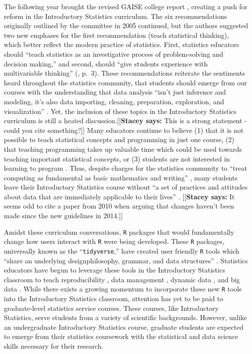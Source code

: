 \documentclass[12pt]{article}
\newcommand{\stacey}[1]{{\color{purple}[[\textbf{Stacey says: }#1]]}}
\begin{document}
\quad The following year brought the revised GAISE college report 
\citep{gaise}, creating a push for reform in the Introductory Statistics 
curriculum. The six recommendations originally outlined by the committee in 2005
continued, but the authors suggested two new emphases for the first
recommendation (teach statistical thinking), which better reflect the modern
practice of statistics. First, statistics educators should ``teach statistics as
an investigative process of problem-solving and decision making,'' and second, should 
``give students experience with multivariable thinking'' (\citeyear{gaise}, 
p.\ 3). These recommendations reiterate the sentiments heard throughout the
statistics community, that students should emerge from our courses with the
understanding that data analysis ``isn't just inference and modeling, it's also
data importing, cleaning, preparation, exploration, and visualization'' 
\citep{mine-jsm}. Yet, the inclusion of these topics in the Introductory 
Statistics curriculum is still a heated discussion.\stacey{This is a strong statement -
could you cite something?} Many educators continue to 
believe (1) that it is not possible to teach statistical concepts and 
programming in just one course, (2) that teaching programming takes up valuable
time which could be used towards teaching important statistical concepts, or 
(3) students are not interested in learning to program \citep{mine-jsm}. Thus, 
despite charges for the statistics community to ``treat computing as fundamental
as basic mathematics and writing'' \citep[p.\ 298]{esr}, many students leave
their Introductory Statistics course without ``a set of practices and attitudes
about data that are immediately applicable to their lives'' 
\citep[p.\ 309]{gould}. \stacey{It seems odd to cite a paper from 2010 when
arguing that changes haven't been made since the new guidelines in 2014.}

\quad Amidst these curriculum conversations, \texttt{R} packages that
would fundamentally change how users interact with \texttt{R} were being
developed. These \texttt{R} packages, universally known as the 
``\texttt{tidyverse},'' have created user friendly \texttt{R} tools which 
``share an underlying designphilosophy, grammar, and data structures'' 
\citep{tidyverse}. Statistics educators have begun to leverage these tools in
the Introductory Statistics classroom to teach reproducibility 
\citep{mine-rmarkdown}, data management \citep{horton_takingachance}, dynamic
data \citep{hardin-tise}, and big data \citep{horton-tise}. While there exists a
growing momentum to incorporate these new \texttt{R} tools into the Introductory
Statistics classroom, attention has yet to be paid to graduate-level statistics
service courses. These courses, like Introductory Statistics, serve students
from a variety of scientific backgrounds. However, unlike an undergraduate
Introductory Statistics course, graduate students are expected to emerge from
their statistics coursework with the statistical and data science skills
necessary for their research. 
\end{document}

